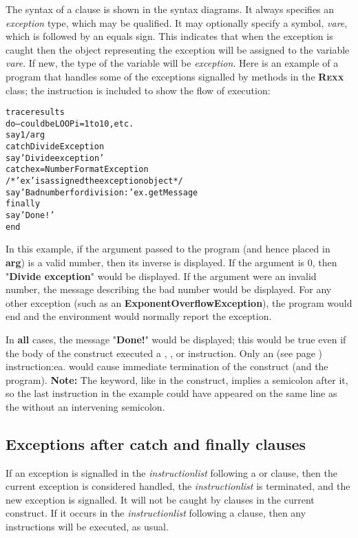 The syntax of a  clause is shown in the syntax diagrams.
It always specifies an \emph{exception} type, which may be
qualified.  It may optionally specify a symbol, \emph{vare}, which
is followed by an equals sign.  This indicates that when the exception
is caught then the object representing the exception will be assigned to
the variable \emph{vare}.  If new, the type of the variable will be
\emph{exception}.
 Here is an example of a program that handles some of the exceptions
signalled by methods in the \textbf{R\textsc{exx}} class; the  instruction is included to show the flow of execution:
\begin{alltt}
trace results
do                -- could be LOOP i=1 to 10, etc.
  say 1/arg
catch DivideException
  say 'Divide exception'
catch ex=NumberFormatException
  /* 'ex' is assigned the exception object */
  say 'Bad number for division:' ex.getMessage
finally
  say 'Done!'
end
\end{alltt}
In this example, if the argument passed to the program (and hence
placed in \textbf{arg}) is a valid number, then its inverse is
displayed.  If the argument is 0, then "\textbf{Divide
exception}" would be displayed.  If the argument were an invalid
number, the message describing the bad number would be displayed.
For any other exception (such as an \textbf{ExponentOverflowException}),
the program would end and the environment would normally report the
exception.
 
In \textbf{all} cases, the message "\textbf{Done!}" would be
displayed; this would be true even if the body of the 
construct executed a , , or
 instruction.  Only an   (see page \pageref{refexit}) 
instruction:ea. would cause immediate termination of the construct (and
the program).
\textbf{Note: }The  keyword, like  in the
 construct, implies a semicolon after it, so the last
 instruction in the example could have appeared on the same
line as the  without an intervening semicolon.
\subsection{Exceptions after catch and finally clauses}
 
If an exception is signalled in the \emph{instructionlist} following
a  or  clause, then the current exception
is considered handled, the \emph{instructionlist} is terminated, and
the new exception is signalled.  It will not be caught by 
clauses in the current construct.  If it occurs in the
\emph{instructionlist} following a  clause, then any
 instructions will be executed, as usual.
 
